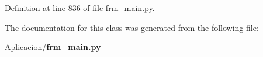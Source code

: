 \subsubsection[{tlepri\-\_\-edit}]{}\label{class_aplicacion_1_1frm__main_1_1_proc_mision_aff624b7080bfce3b21dee4783d67e315}


\-Definition at line 836 of file frm\-\_\-main.\-py.



\-The documentation for this class was generated from the following file\-:\begin{DoxyCompactItemize}
\item 
\-Aplicacion/{\bf frm\-\_\-main.\-py}\end{DoxyCompactItemize}
